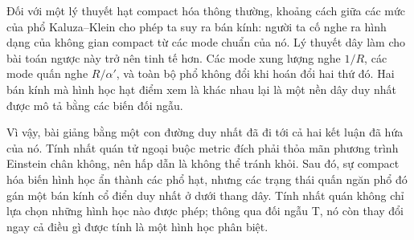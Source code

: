 Đối với một lý thuyết hạt compact hóa thông thường, khoảng cách giữa các mức của phổ Kaluza--Klein cho phép ta suy ra bán kính: người ta cố nghe ra hình dạng của không gian compact từ các mode chuẩn của nó. Lý thuyết dây làm cho bài toán ngược này trở nên tinh tế hơn. Các mode xung lượng nghe \(1/R\), các mode quấn nghe \(R/\alpha'\), và toàn bộ phổ không đổi khi hoán đổi hai thứ đó. Hai bán kính mà hình học hạt điểm xem là khác nhau lại là một nền dây duy nhất được mô tả bằng các biến đối ngẫu.

Vì vậy, bài giảng bằng một con đường duy nhất đã đi tới cả hai kết luận đã hứa của nó. Tính nhất quán tử ngoại buộc metric đích phải thỏa mãn phương trình Einstein chân không, nên hấp dẫn là không thể tránh khỏi. Sau đó, sự compact hóa biến hình học ẩn thành các phổ hạt, nhưng các trạng thái quấn ngăn phổ đó gán một bán kính cổ điển duy nhất ở dưới thang dây. Tính nhất quán không chỉ lựa chọn những hình học nào được phép; thông qua đối ngẫu T, nó còn thay đổi ngay cả điều gì được tính là một hình học phân biệt.